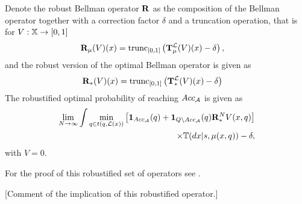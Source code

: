 \documentclass{ifacconf}
\newcommand{\red}[1]{{\color{red} #1}}
\begin{document}
Denote the robust Bellman operator ${\mathbf {R}}$ as the composition of the Bellman operator together with a correction factor $\delta$ and  a truncation operation, that is for $V:{\mathbb{X}}\rightarrow [0,1]$
\begin{align}\label{eq:V_recopt_inf}
& {\mathbf {R}}_\mu (V)(x) = \mathop{\mathrm{trunc}}\nolimits_{[0,1]}\left({\mathbf {T}}_\mu^{\mathcal{L}} (V)(x)-\delta\right),
\end{align}
and the robust version of the optimal Bellman operator is given as 
\begin{align}\label{eq:V_recopt_inf}
& {\mathbf {R}}_\ast (V)(x)= \mathop{\mathrm{trunc}}\nolimits_{[0,1]}\left({\mathbf {T}}_\ast^{\mathcal{L}} (V)(x)-\delta\right)
\end{align}
The robustified optimal probability of reaching $Acc_{\mathcal{A}}$ is given as
\begin{align}
	\lim_{N\rightarrow \infty}\int \min_{\bar q \in t(q,\Labset(\bar x))}\left[\mathbf 1_{Acc_\FSA }(\bar q)+ \mathbf 1_{Q \setminus Acc_\FSA }(\bar q) \BelR^N_\ast V(\bar x, \bar q)\right]\notag\\\times\bar{\mathbb{T}} (d\bar x|s,\mu(x,q))-\delta,
\end{align}
with $V=0$.


For the proof of this robustified set of operators see \cite{tech_report_TACAS}.

\red{[Comment of the implication of this robustified operator.]}



\begin{figure}[htp]
\centering
{}

\end{figure}
\end{document}
